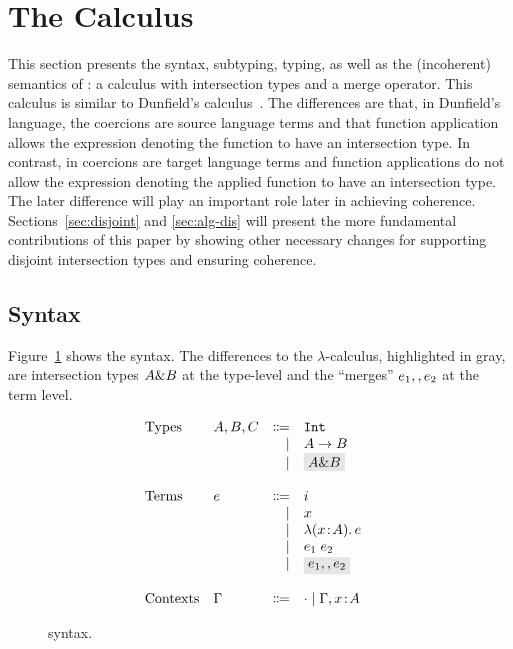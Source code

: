 \section{The \name Calculus}
\label{sec:fi}

This section presents the syntax, subtyping, typing, as well as the (incoherent)
semantics of \name: a calculus with intersection types and a merge operator.
This calculus is similar to Dunfield's calculus~\cite{dunfield2014elaborating}.
The differences are that, in Dunfield's language, the coercions are source
language terms and that function application allows the expression denoting the
function to have an intersection type. In contrast, in \name coercions are
target language terms and function applications do not allow the expression
denoting the applied function to have an intersection type. The later
difference will play an important role later in achieving coherence.
Sections~\ref{sec:disjoint} and \ref{sec:alg-dis} will present the more fundamental contributions of this
paper by showing other necessary changes for supporting
disjoint intersection types and ensuring coherence.

\subsection{Syntax}

Figure~\ref{fig:fi-syntax} shows the syntax. The differences to the
$\lambda$-calculus, highlighted in gray, are intersection types $A \& B$ at
the type-level and the ``merges'' $e_1 ,, e_2$ at the term level.

\begin{figure}[t]
  \[
    \begin{array}{l}
      \begin{array}{llrll}
        \text{Types}
        & A, B, C & \Coloneqq & \code{Int} & \\
        &         & \mid      & A \to B    & \\
        &         & \mid      & \highlight{$A \inter B$}  & \\

        \\
        \text{Terms}
        & e & \Coloneqq & i            & \\
        &   & \mid & x                 & \\
        &   & \mid & \lamty x A e      & \\
        &   & \mid & \app {e_1} {e_2}  & \\
        &   & \mid & \highlight{$e_1 \mergeop e_2$}  & \\

        \\
        \text{Contexts}
        & \Gamma & \Coloneqq & \cdot
                   \mid \Gamma, x \oftype A  & \\
      \end{array}
    \end{array}
  \]

  \caption{\name syntax.}
  \label{fig:fi-syntax}
\end{figure}

